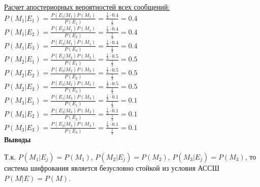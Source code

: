 \documentclass[a4paper,14pt]{extarticle}
\begin{document}
    \underline{Расчет апостериорных вероятностей всех сообщений:}\\
    \noindent$P(M_1|E_1)=\frac{P(E_1|M_1)P(M_1)}{P(E_1)}=\frac{\frac{1}{3}\cdot0.4}{\frac{1}{3}}=0.4$\\
    $P(M_1|E_2)=\frac{P(E_2|M_1)P(M_1)}{P(E_2)}=\frac{\frac{1}{3}\cdot0.4}{\frac{1}{3}}=0.4$\\
    $P(M_1|E_3)=\frac{P(E_3|M_1)P(M_1)}{P(E_3)}=\frac{\frac{1}{3}\cdot0.4}{\frac{1}{3}}=0.4$\\
    $P(M_2|E_1)=\frac{P(E_1|M_2)P(M_2)}{P(E_1)}=\frac{\frac{1}{3}\cdot0.5}{\frac{1}{3}}=0.5$\\
    $P(M_2|E_2)=\frac{P(E_2|M_2)P(M_2)}{P(E_2)}=\frac{\frac{1}{3}\cdot0.5}{\frac{1}{3}}=0.5$\\
    $P(M_2|E_3)=\frac{P(E_3|M_2)P(M_2)}{P(E_3)}=\frac{\frac{1}{3}\cdot0.5}{\frac{1}{3}}=0.5$\\
    $P(M_3|E_1)=\frac{P(E_1|M_3)P(M_3)}{P(E_1)}=\frac{\frac{1}{3}\cdot0.1}{\frac{1}{3}}=0.1$\\
    $P(M_3|E_2)=\frac{P(E_2|M_3)P(M_3)}{P(E_2)}=\frac{\frac{1}{3}\cdot0.1}{\frac{1}{3}}=0.1$\\
    $P(M_3|E_3)=\frac{P(E_3|M_3)P(M_3)}{P(E_3)}=\frac{\frac{1}{3}\cdot0.1}{\frac{1}{3}}=0.1$\\
    \textbf{Выводы}

    Т.к. $P(M_1|E_j)=P(M_1)$, $P(M_2|E_j)=P(M_2)$, $P(M_3|E_j)=P(M_3)$, то система шифрования 
    является безусловно стойкой из условия АССШ $P(M|E) = P(M)$.
\end{document}
